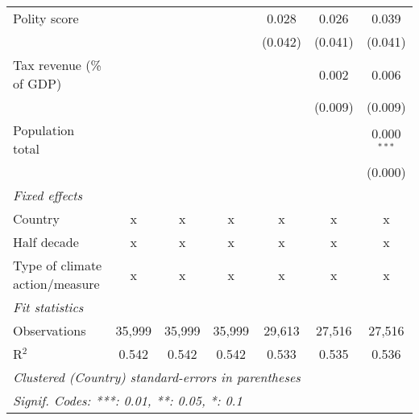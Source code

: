 \begin{tabular}{lcccccc}
   Polity score                                                             &              &               &               & 0.028         & 0.026         & 0.039\\   
                                                                            &              &               &               & (0.042)       & (0.041)       & (0.041)\\   
   Tax revenue (\% of GDP)                                                  &              &               &               &               & 0.002         & 0.006\\   
                                                                            &              &               &               &               & (0.009)       & (0.009)\\   
   Population total                                                         &              &               &               &               &               & 0.000$^{***}$\\   
                                                                            &              &               &               &               &               & (0.000)\\   
   \emph{Fixed effects}\\
   Country                                                                  & x            & x             & x             & x             & x             & x\\  
   Half decade                                                              & x            & x             & x             & x             & x             & x\\  
   Type of climate action/measure                                           & x            & x             & x             & x             & x             & x\\  
   \midrule \emph{Fit statistics}\\
   Observations                                                             & 35,999       & 35,999        & 35,999        & 29,613        & 27,516        & 27,516\\  
   R$^2$                                                                    & 0.542        & 0.542         & 0.542         & 0.533         & 0.535         & 0.536\\  
   \midrule
   \multicolumn{7}{l}{\emph{Clustered (Country) standard-errors in parentheses}}\\
   \multicolumn{7}{l}{\emph{Signif. Codes: ***: 0.01, **: 0.05, *: 0.1}}\\
\end{tabular}
\par\endgroup


